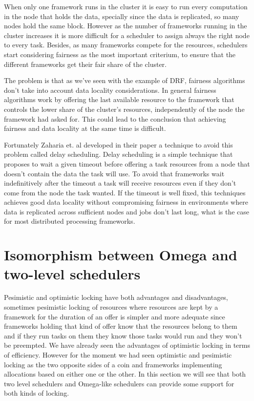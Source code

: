 \documentclass{report}                     %
\begin{document}
When only one framework runs in the cluster it is easy to run every
computation in the node that holds the data, specially since the data
is replicated, so many nodes hold the same block. However as
the number of frameworks running in the cluster increases it is more
difficult for a scheduler to assign always the right node to every
task. Besides, as many frameworks compete for the resources, schedulers
start considering fairness as the most important criterium, to ensure
that the different frameworks get their fair share of the cluster.

The problem is that as we've seen with the example of DRF, fairness
algorithms don't take into account data locality considerations. In
general fairness algorithms work by offering the last available
resource to the framework that controls the lower share of the cluster's
resources, independently of the node the framework had asked for. This
could lead to the conclusion that achieving fairness and data locality
at the same time is difficult.

Fortunately Zaharia et. al developed in their paper
\cite{zaharia_delay_2010} a technique to avoid this problem called
delay scheduling. Delay scheduling is a simple technique that proposes
to wait a given timeout before offering a task resources from a node
that doesn't contain the data the task will use. To avoid that
frameworks wait indefinitively after the timeout a task will receive
resources even if they don't come from the node the task wanted. If
the timeout is well fixed, this techniques achieves good data locality
without compromising fairness in environments where data is replicated
across sufficient nodes and jobs don't last long, what is the case for
most distributed processing frameworks.



\section {Isomorphism between Omega and two-level schedulers}
\label{sec:mixed}

Pesimistic and optimistic locking have both advantages and
disadvantages, sometimes pesimistic locking of resources where
resources are kept by a framework for the duration of an offer is
simpler and more adequate since frameworks holding that kind of offer
know that the resources belong to them and if they run tasks on them
they know those tasks would run and they won't be preempted. We have
already seen the advantages of optimistic locking in terms of
efficiency. However for the moment we had seen optimistic and
pesimistic locking as the two opposite sides of a coin and frameworks
implementing allocations based on either one or the other. In this
section we will see that both two level schedulers and Omega-like
schedulers can provide some support for both kinds of locking.
\end{document}
